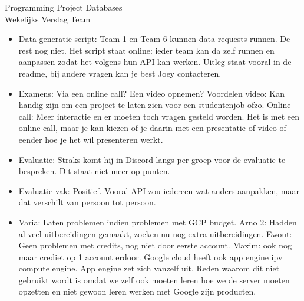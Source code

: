 \documentclass{article}
\newcounter{team}
\begin{document}

	\begin{Minutes}{Programming Project Databases \\ Wekelijks Verslag Team }
		\missingNoExcuse{/}
		\missingExcused{/}

		\maketitle

            \begin{itemize}
                \item Data generatie script: Team 1 en Team 6 kunnen data requests runnen. De rest nog niet. Het script staat online: ieder team kan da zelf runnen en aanpassen zodat het volgens hun API kan werken. Uitleg staat vooral in de readme, bij andere vragen kan je best Joey contacteren.
                \item Examens: Via een online call? Een video opnemen? Voordelen video: Kan handig zijn om een project te laten zien voor een studentenjob ofzo. Online call: Meer interactie en er moeten toch vragen gesteld worden. Het is met een online call, maar je kan kiezen of je daarin met een presentatie of video of eender hoe je het wil presenteren werkt.
                \item Evaluatie: Straks komt hij in Discord langs per groep voor de evaluatie te bespreken. Dit staat niet meer op punten.
                \item Evaluatie vak: Positief. Vooral API zou iedereen wat anders aanpakken, maar dat verschilt van persoon tot persoon.
                \item Varia: Laten problemen indien problemen met GCP budget. Arno 2: Hadden al veel uitbereidingen gemaakt, zoeken nu nog extra uitbereidingen. Ewout: Geen problemen met credits, nog niet door eerste account. Maxim: ook nog maar crediet op 1 account erdoor. Google cloud heeft ook app engine ipv compute engine. App engine zet zich vanzelf uit. Reden waarom dit niet gebruikt wordt is omdat we zelf ook moeten leren hoe we de server moeten opzetten en niet gewoon leren werken met Google zijn producten.
            \end{itemize}


\end{Minutes}
\end{document}

